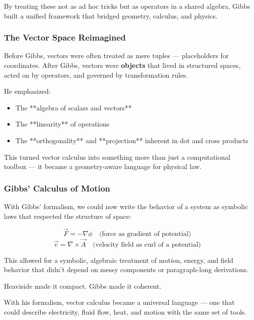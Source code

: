 By treating these not as ad hoc tricks but as operators in a shared algebra, Gibbs built a unified framework that bridged geometry, calculus, and physics.

\subsubsection*{The Vector Space Reimagined}

Before Gibbs, vectors were often treated as mere tuples — placeholders for coordinates.  
After Gibbs, vectors were \textbf{objects} that lived in structured spaces, acted on by operators, and governed by transformation rules.

He emphasized:

\begin{itemize}
    \item The **algebra of scalars and vectors**
    \item The **linearity** of operations
    \item The **orthogonality** and **projection** inherent in dot and cross products
\end{itemize}

This turned vector calculus into something more than just a computational toolbox — it became a geometry-aware language for physical law.

\subsubsection*{Gibbs’ Calculus of Motion}

With Gibbs’ formalism, we could now write the behavior of a system as symbolic laws that respected the structure of space:

\[
\vec{F} = -\nabla \phi \quad \text{(force as gradient of potential)}
\]
\[
\vec{v} = \nabla \times \vec{A} \quad \text{(velocity field as curl of a potential)}
\]

This allowed for a symbolic, algebraic treatment of motion, energy, and field behavior that didn’t depend on messy components or paragraph-long derivations.

\begin{tcolorbox}[colback=blue!5!white, colframe=blue!50!black, title={Gibbs’ Gift to Vector Calculus}]
Heaviside made it compact.  
Gibbs made it coherent.

With his formalism, vector calculus became a universal language —  
one that could describe electricity, fluid flow, heat, and motion  
with the same set of tools.
\end{tcolorbox}

